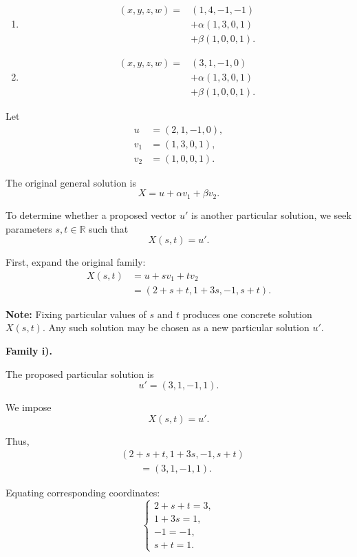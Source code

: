 \begin{enumerate}[label=\alph*)]
\begin{enumerate}[label=\roman*)]
\item
$$
\begin{aligned}
(x,y,z,w)
={}&(1,4,-1,-1)\\
&+\alpha(1,3,0,1)\\
&+\beta(1,0,0,1).
\end{aligned}
$$

\item
$$
\begin{aligned}
(x,y,z,w)
={}&(3,1,-1,0)\\
&+\alpha(1,3,0,1)\\
&+\beta(1,0,0,1).
\end{aligned}
$$

\end{enumerate}

\begin{answer}
    Let
    $$
    \begin{aligned}
    u&=(2,1,-1,0),\\
    v_1&=(1,3,0,1),\\
    v_2&=(1,0,0,1).
    \end{aligned}
    $$

    The original general solution is
    $$
    X=u+\alpha v_1+\beta v_2.
    $$

    To determine whether a proposed vector $u'$ is another particular
    solution, we seek parameters $s,t\in\mathbb{R}$ such that
    $$
    X(s,t)=u'.
    $$

    First, expand the original family:
    $$
    \begin{aligned}
    X(s,t)
    &=u+sv_1+tv_2\\
    &=(2+s+t,1+3s,-1,s+t).
    \end{aligned}
    $$

    {\color{red}
    \textbf{Note:} Fixing particular values of $s$ and $t$ produces one concrete solution $X(s,t)$.
    Any such solution may be chosen as a new particular solution $u'$.}

    \textbf{Family i).}

    The proposed particular solution is
    $$
    u'=(3,1,-1,1).
    $$

    We impose
    $$
    X(s,t)=u'.
    $$

    Thus,
    $$
    \begin{aligned}
    &(2+s+t,1+3s,-1,s+t)\\
    &\qquad=(3,1,-1,1).
    \end{aligned}
    $$

    Equating corresponding coordinates:
    $$
    \begin{cases}
    2+s+t=3,\\
    1+3s=1,\\
    -1=-1,\\
    s+t=1.
    \end{cases}
    $$


\end{answer}
\end{enumerate}
